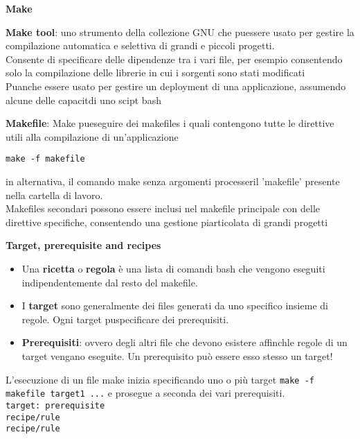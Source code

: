 \begin{flushleft}
  \textbf{Make}\par 
  \textbf{Make tool}: \ace uno strumento della collezione GNU che pu\aco essere usato 
  per gestire la compilazione automatica e selettiva di grandi e piccoli progetti. \\
  Consente di specificare delle dipendenze tra i vari file, per esempio consentendo solo 
  la compilazione delle librerie in cui i sorgenti sono stati modificati\\ 
  Pu\aco anche essere usato per gestire un deployment di una applicazione, assumendo 
  alcune delle capacit\aca  di uno scipt bash \par 
  \textbf{Makefile}: Make pu\aco eseguire dei makefiles i quali contengono tutte le direttive 
  utili alla compilazione di un'applicazione 
  \begin{center}
    \texttt{make -f makefile}
  \end{center}
  in alternativa, il comando make senza argomenti processer\aca il 'makefile' presente 
  nella cartella di lavoro. \\ 
  Makefiles secondari possono essere inclusi nel makefile principale con delle 
  direttive specifiche, consentendo una gestione pi\acu articolata di grandi progetti
  \begin{flushleft}
    \textbf{Target, prerequisite and recipes}
    \begin{itemize}
      \item Una \textbf{ricetta} o \textbf{regola} è una lista di comandi bash che 
            vengono eseguiti indipendentemente dal resto del makefile.
      \item I \textbf{target} sono generalmente dei files generati da uno specifico insieme di regole. 
            Ogni target pu\aco specificare dei prerequisiti.
      \item \textbf{Prerequisiti}: ovvero degli altri file che devono esistere affinch\ace le regole di un 
            target vengano eseguite. Un prerequisito può essere esso stesso un target! 
    \end{itemize}
    L'esecuzione di un file make inizia specificando uno o più target 
    \texttt{make -f makefile target1 ...} e prosegue a seconda dei vari prerequisiti.\\
    \texttt{target: prerequisite \\
            \tab recipe/rule \\
            \tab recipe/rule \\
}
\end{flushleft}
\end{flushleft}

